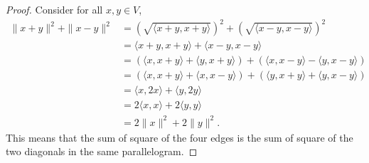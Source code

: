 \begin{Exercise}
	\begin{proof}
		Consider for all $x,y\in V$,
		\begin{align*}
		\| x+y \|^2 + \| x-y \|^2
		&= \left(\sqrt{\langle x+y, x+y \rangle}\right)^2 + \left(\sqrt{\langle x-y, x-y \rangle}\right)^2 \\
		&= \langle x+y, x+y \rangle + \langle x-y, x-y \rangle \\
		&= (\langle x,x+y \rangle + \langle y,x+y \rangle) + (\langle x,x-y \rangle - \langle y,x-y \rangle) \\
		&= (\langle x,x+y \rangle + \langle x, x-y \rangle) + (\langle y,x+y \rangle + \langle y,x-y \rangle) \\
		&= \langle x,2x \rangle + \langle y,2y \rangle \\
		&= 2\langle x,x \rangle + 2\langle y,y \rangle \\
		&= 2\|x\|^2 + 2\|y\|^2.
		\end{align*}
		This means that the sum of square of the four edges is
		the sum of square of the two diagonals in the same parallelogram.
	\end{proof}
\end{Exercise}